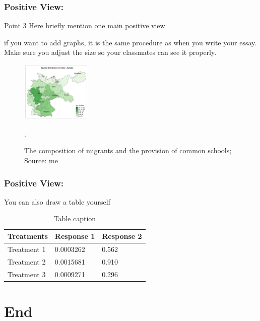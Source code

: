 \documentclass{beamer}
\begin{document}
\begin{frame}
\frametitle{Positive View: }

\begin{block}{Point 3}
Here briefly mention one main positive view
\end{block}

if you want to add graphs, it is the same procedure as when you write your essay. Make sure you adjust the size so your classmates can see it properly.
\begin{figure}[hbt!]
    \centering
    \includegraphics[width=0.3\textwidth]{paper/output/descriptive/map_cities_sample.png}
    \caption{The composition of migrants and the provision of common schools; Source: me}.
    \label{table:my_label}
\end{figure}

\end{frame}


\begin{frame}
\frametitle{Positive View: }
You can also draw a table yourself

\begin{table}
\begin{tabular}{l l l}
\toprule
\textbf{Treatments} & \textbf{Response 1} & \textbf{Response 2}\\
\midrule
Treatment 1 & 0.0003262 & 0.562 \\
Treatment 2 & 0.0015681 & 0.910 \\
Treatment 3 & 0.0009271 & 0.296 \\
\bottomrule
\end{tabular}
\caption{Table caption}
\end{table}

\end{frame}



\section{End}%
\end{document}
